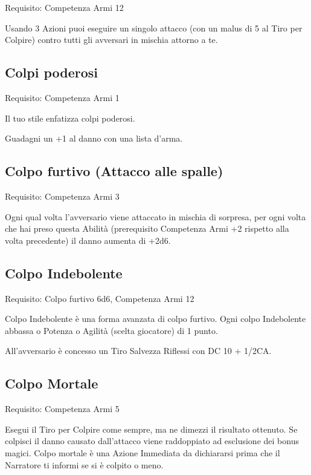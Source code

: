 \documentclass[a4paper,11pt,twoside,openany]{book}
\begin{document}
Requisito: Competenza Armi 12

Usando 3 Azioni puoi eseguire un singolo attacco (con un malus di 5 al Tiro per Colpire) contro tutti gli avversari in mischia attorno a te.

\subsection{Colpi poderosi}

Requisito: Competenza Armi 1

Il tuo stile enfatizza colpi poderosi.

Guadagni un +1 al danno con una lista d'arma.

\subsection{Colpo furtivo (Attacco alle spalle)}

Requisito: Competenza Armi 3

Ogni qual volta l'avversario viene attaccato in mischia di sorpresa, per ogni volta che hai preso questa Abilità (prerequisito Competenza Armi +2 rispetto alla volta precedente) il danno aumenta di +2d6.

\subsection{Colpo Indebolente}

Requisito: Colpo furtivo 6d6, Competenza Armi 12

Colpo Indebolente è una forma avanzata di colpo furtivo. Ogni colpo Indebolente abbassa o Potenza o Agilità (scelta giocatore) di 1 punto.

All'avversario è concesso un Tiro Salvezza Riflessi con DC 10 + 1/2CA.

\subsection{Colpo Mortale}

Requisito: Competenza Armi 5

Esegui il Tiro per Colpire come sempre, ma ne dimezzi il risultato ottenuto. Se colpisci il danno causato dall'attacco viene raddoppiato ad esclusione dei bonus magici. Colpo mortale è una Azione Immediata da dichiararsi prima che il Narratore ti informi se si è colpito o meno.
\end{document}
